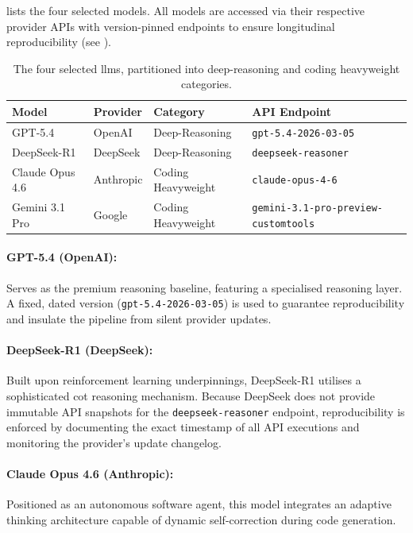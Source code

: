  lists the four selected models.
All models are accessed via their respective provider APIs with version-pinned endpoints to ensure longitudinal reproducibility (see ).

\begin{table}[htbp]
  \centering
  \caption{The four selected \glspl{llm}, partitioned into deep-reasoning and coding heavyweight categories.}
  \label{tab:selected_llms}
  \small
  \begin{tabular}{l l l l}
    \toprule
    \textbf{Model} & \textbf{Provider} & \textbf{Category} & \textbf{API Endpoint} \\
    \midrule
    GPT-5.4    & OpenAI    & Deep-Reasoning    & \texttt{gpt-5.4-2026-03-05} \\
    DeepSeek-R1 & DeepSeek & Deep-Reasoning    & \texttt{deepseek-reasoner} \\
    Claude Opus 4.6 & Anthropic & Coding Heavyweight & \texttt{claude-opus-4-6} \\
    Gemini 3.1 Pro & Google  & Coding Heavyweight & \texttt{gemini-3.1-pro-preview-customtools} \\
    \bottomrule
  \end{tabular}
\end{table}

\paragraph{GPT-5.4 (OpenAI):}
Serves as the premium reasoning baseline, featuring a specialised reasoning layer.
A fixed, dated version (\texttt{gpt-5.4-2026-03-05}) is used to guarantee reproducibility and insulate the pipeline from silent provider updates.

\paragraph{DeepSeek-R1 (DeepSeek):}
Built upon reinforcement learning underpinnings, DeepSeek-R1 utilises a sophisticated \gls{cot} reasoning mechanism.
Because DeepSeek does not provide immutable API snapshots for the \texttt{deepseek-reasoner} endpoint, reproducibility is enforced by documenting the exact timestamp of all API executions and monitoring the provider's update changelog.

\paragraph{Claude Opus 4.6 (Anthropic):}
Positioned as an autonomous software agent, this model integrates an adaptive thinking architecture capable of dynamic self-correction during code generation.

